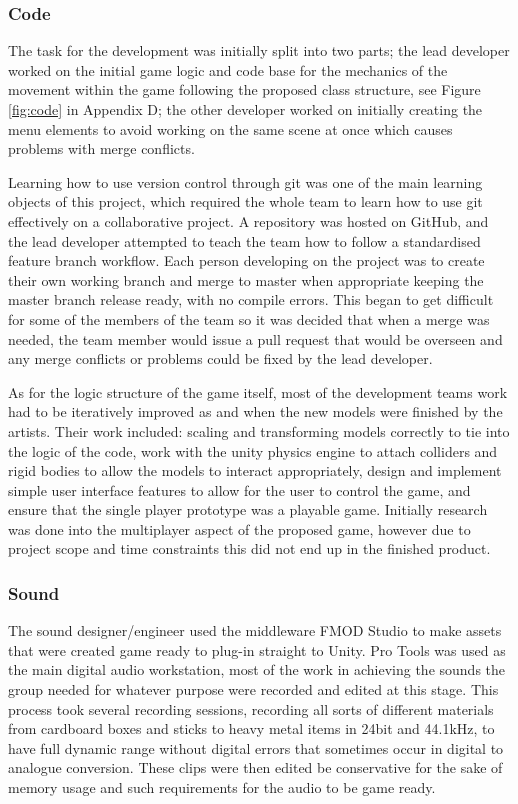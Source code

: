 \documentclass[12pt]{article}
\begin{document}
\subsubsection{Code}

The task for the development was initially split into two parts; the lead developer worked on the initial game logic and code base for the mechanics of the movement within the game following the proposed class structure, see Figure \ref{fig:code} in Appendix D; the other developer worked on initially creating the menu elements to avoid working on the same scene at once which causes problems with merge conflicts. 

Learning how to use version control through git was one of the main learning objects of this project, which required the whole team to learn how to use git effectively on a collaborative project. A repository was hosted on GitHub, and the lead developer attempted to teach the team how to follow a standardised feature branch workflow. Each person developing on the project was to create their own working branch and merge to master when appropriate keeping the master branch release ready, with no compile errors. This began to get difficult for some of the members of the team so it was decided that when a merge was needed, the team member would issue a pull request that would be overseen and any merge conflicts or problems could be fixed by the lead developer.

As for the logic structure of the game itself, most of the development teams work had to be iteratively improved as and when the new models were finished by the artists. Their work included: scaling and transforming models correctly to tie into the logic of the code, work with the unity physics engine to attach colliders and rigid bodies to allow the models to interact appropriately, design and implement simple user interface features to allow for the user to control the game, and ensure that the single player prototype was a playable game. Initially research was done into the multiplayer aspect of the proposed game, however due to project scope and time constraints this did not end up in the finished product.  

\subsubsection{Sound}

The sound designer/engineer used the middleware FMOD Studio to make assets that were created game ready to plug-in straight to Unity. Pro Tools was used as the main digital audio workstation, most of the work in achieving the sounds the group needed for whatever purpose were recorded and edited at this stage. This process took several recording sessions, recording all sorts of different materials from cardboard boxes and sticks to heavy metal items in 24bit and 44.1kHz, to have full dynamic range without digital errors that sometimes occur in digital to analogue conversion. These clips were then edited be conservative for the sake of memory usage and such requirements for the audio to be game ready.
\end{document}
